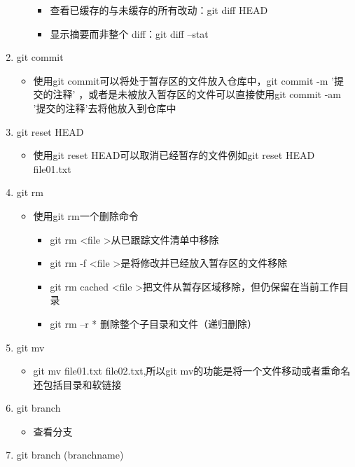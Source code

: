 \documentclass[a4paper, 12pt]{article}
\begin{document}
\begin{enumerate}
\begin{itemize}
\begin{itemize}
          \item 查看已缓存的与未缓存的所有改动：git diff HEAD
          \item 显示摘要而非整个 diff：git diff --stat
        \end{itemize}
    \end{itemize}
  \item{\large git commit}
    \begin{itemize}
      \item 使用git commit可以将处于暂存区的文件放入仓库中，git commit -m '提交的注释' ，或者是未被放入暂存区的文件可以直接使用git commit -am '提交的注释'去将他放入到仓库中
    \end{itemize}
  \item{\large git reset HEAD}
    \begin{itemize}
      \item 使用git reset HEAD可以取消已经暂存的文件例如git reset HEAD file01.txt 
    \end{itemize}
  \item{\large git rm}
    \begin{itemize}
      \item 使用git rm一个删除命令
        \begin{itemize}
          \item git rm \textless file \textgreater 从已跟踪文件清单中移除
          \item git rm -f \textless file \textgreater 是将修改并已经放入暂存区的文件移除
          \item git rm cached \textless file \textgreater 把文件从暂存区域移除，但仍保留在当前工作目录
          \item git rm –r * 删除整个子目录和文件（递归删除）
        \end{itemize}
    \end{itemize}
  \item{\large git mv}
    \begin{itemize}
      \item git mv file01.txt file02.txt,所以git mv的功能是将一个文件移动或者重命名还包括目录和软链接
    \end{itemize}
  \item{\large git branch}
    \begin{itemize}
      \item 查看分支
    \end{itemize}
  \item{\large git branch (branchname)}
    \begin{itemize}

\end{itemize}
\end{enumerate}
\end{document}
